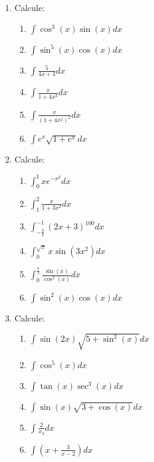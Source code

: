 \documentclass[oneside,a4paper,12pt]{article}
\begin{document}
\begin{enumerate}
	\item Calcule:
	\begin{multicols}{2}
		\begin{enumerate}
			\item $\displaystyle \int \cos^3(x)\sin(x)dx$
			\item $\displaystyle \int \sin^5(x)\cos(x)dx$
			\item $\displaystyle \int \frac{5}{4x+3}dx$
			\item $\displaystyle \int \frac{x}{1+4x^2}dx$
			\item $\displaystyle \int \frac{x}{(1+4x^2)^2}dx$
			\item $\displaystyle \int e^x\sqrt{1+e^x}dx$
		\end{enumerate}
	\end{multicols}
	
	\item Calcule:
	\begin{multicols}{2}
		\begin{enumerate}
			\item $\displaystyle \int_{0}^{1}xe^{-x^2}dx$
			\item $\displaystyle \int_{1}^{2}\frac{x}{1+3x^2}dx$
			\item $\displaystyle \int_{-\frac{3}{2}}^{-1}(2x+3)^100 dx$
			\item $\displaystyle \int_{0}^{\sqrt{\pi}}x\sin(3x^2)dx$
			\item $\displaystyle \int_{0}^{\frac{\pi}{3}}\frac{\sin(x)}{\cos^2(x)}dx$
			\item $\displaystyle \int \sin^2(x)\cos(x)dx$
		\end{enumerate}
	\end{multicols}
	
	\item Calcule:
	\begin{multicols}{2}
		\begin{enumerate}
			\item $\displaystyle \int \sin(2x)\sqrt{5+\sin^2(x)}dx$
			\item $\displaystyle \int \cos^5(x)dx$
			\item $\displaystyle \int \tan(x)\sec^3(x)dx$
			\item $\displaystyle \int \sin(x)\sqrt{3+ \cos(x)}dx$
			\item $\displaystyle \int \frac{2}{x_3}dx$
			\item $\displaystyle \int \left( x + \frac{3}{x-2} \right)dx$
		\end{enumerate}
	\end{multicols}
	

\end{enumerate}
\end{document}
